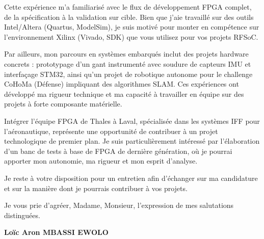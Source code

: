 \documentclass[11pt,a4paper]{letter}
\begin{document}
\vspace{0.3cm}

Cette expérience m'a familiarisé avec le flux de développement FPGA complet, de la spécification à la validation sur cible. Bien que j'aie travaillé sur des outils Intel/Altera (Quartus, ModelSim), je suis motivé pour monter en compétence sur l'environnement Xilinx (Vivado, SDK) que vous utilisez pour vos projets RFSoC.

\vspace{0.3cm}

Par ailleurs, mon parcours en systèmes embarqués inclut des projets hardware concrets : prototypage d'un gant instrumenté avec soudure de capteurs IMU et interfaçage STM32, ainsi qu'un projet de robotique autonome pour le challenge CoHoMa (Défense) impliquant des algorithmes SLAM. Ces expériences ont développé ma rigueur technique et ma capacité à travailler en équipe sur des projets à forte composante matérielle.

\vspace{0.2cm}

Intégrer l'équipe FPGA de Thales à Laval, spécialisée dans les systèmes IFF pour l'aéronautique, représente une opportunité de contribuer à un projet technologique de premier plan. Je suis particulièrement intéressé par l'élaboration d'un banc de tests à base de FPGA de dernière génération, où je pourrai apporter mon autonomie, ma rigueur et mon esprit d'analyse.

\vspace{0.2cm}

Je reste à votre disposition pour un entretien afin d'échanger sur ma candidature et sur la manière dont je pourrais contribuer à vos projets.

\vspace{0.2cm}

Je vous prie d'agréer, Madame, Monsieur, l'expression de mes salutations distinguées.

\noindent\textbf{Loïc Aron MBASSI EWOLO}
\end{document}
